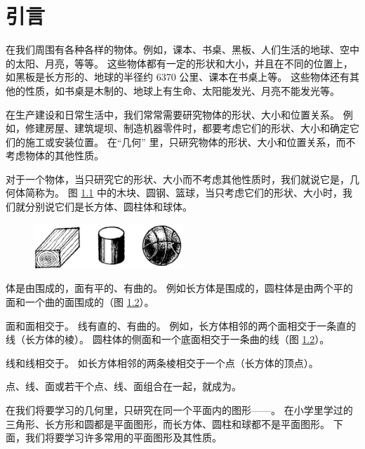 \chapter{引言}

在我们周围有各种各样的物体。例如，课本、书桌、黑板、人们生活的地球、空中的太阳、月亮，等等。
这些物体都有一定的形状和大小，并且在不同的位置上，如黑板是长方形的、地球的半径约 6370 公里、课本在书桌上等。
这些物体还有其他的性质，如书桌是木制的、地球上有生命、太阳能发光、月亮不能发光等。

在生产建设和日常生活中，我们常常需要研究物体的形状、大小和位置关系。
例如，修建房屋、建筑堤坝、制造机器零件时，都要考虑它们的形状、大小和确定它们的施工或安装位置。
在“几何” \footnotemark 里，只研究物体的形状、大小和位置关系，而不考虑物体的其他性质。

对于一个物体，当只研究它的形状、大小而不考虑其他性质时，我们就说它是，几何体简称为。
图 \ref{fig:czjh1-intro-1} 中的木块、圆钢、篮球，当只考虑它们的形状、大小时，我们就分别说它们是长方体、圆柱体和球体。

\begingroup
\renewcommand{\thefigure}{\arabic{figure}\;}

\begin{figure}[htbp]
    \centering
    \includegraphics[width=0.5\textwidth]{../pic/czjh1-intro-1}
    \caption{}\label{fig:czjh1-intro-1}
\end{figure}

体是由围成的，面有平的、有曲的。
例如长方体是围成的，圆柱体是由两个平的面和一个曲的面围成的（图 \ref{fig:czjh1-intro-2}）。

\begin{figure}[htbp]
    \centering
    
    \caption{}\label{fig:czjh1-intro-2}
\end{figure}

\endgroup

面和面相交于。 线有直的、有曲的。
例如，长方体相邻的两个面相交于一条直的线（长方体的棱）。
圆柱体的侧面和一个底面相交于一条曲的线（图 \ref{fig:czjh1-intro-2}）。

线和线相交于。
如长方体相邻的两条棱相交于一个点（长方体的顶点）。

点、线、面或若干个点、线、面组合在一起，就成为。

在我们将要学习的几何里，只研究在同一个平面内的图形——。
在小学里学过的三角形、长方形和圆都是平面图形，而长方体、圆柱和球都不是平面图形。
下面，我们将要学习许多常用的平面图形及其性质。


